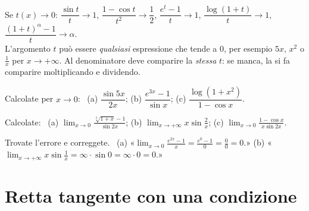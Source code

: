 \begin{vuoto}[Promemoria]{}
Se $t(x)\to0$: \quad $\dfrac{\sin t}t\to1$, \quad $\dfrac{1-\cos t}{t^2}\to\dfrac12$, \quad $\dfrac{e^t-1}t\to1$, \quad $\dfrac{\log(1+t)}t\to1$,\\[2pt]
$\dfrac{(1+t)^\alpha-1}t\to\alpha$.\\[2pt]
L'argomento $t$ può essere \emph{qualsiasi} espressione che tende a $0$, per esempio $5x$, $x^2$ o $\frac1x$ per $x\to+\infty$. Al denominatore deve comparire la \emph{stessa} $t$: se manca, la si fa comparire moltiplicando e dividendo.
\end{vuoto}

\begin{esercizio}[\liv{1}]
Calcolate per $x\to0$: \ (a) $\dfrac{\sin5x}{2x}$; \qquad (b) $\dfrac{e^{3x}-1}{\sin x}$; \qquad (c) $\dfrac{\log(1+x^2)}{1-\cos x}$.
\end{esercizio}

\begin{esercizio}[\liv{2}]
Calcolate: \ (a) $\displaystyle\lim_{x\to0}\frac{\sqrt[3]{1+x}-1}{\sin2x}$; \quad (b) $\displaystyle\lim_{x\to+\infty}x\sin\frac2x$; \quad (c) $\displaystyle\lim_{x\to0}\frac{1-\cos x}{x\sin2x}$.
\end{esercizio}

\begin{esercizio}[\liv{2}]
Trovate l'errore e correggete. \ (a) «$\displaystyle\lim_{x\to0}\frac{e^{2x}-1}x=\frac{e^0-1}0=\frac00=0$.» \quad (b) «$\displaystyle\lim_{x\to+\infty}x\sin\frac1x=\infty\cdot\sin0=\infty\cdot0=0$.»
\end{esercizio}

\section{Retta tangente con una condizione}

